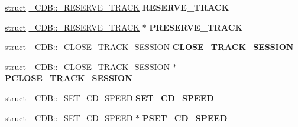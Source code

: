 \begin{DoxyCompactItemize}
\item 
\mbox{\label{union___c_d_b_a91f42014a423f6de89e39864eb13f211}} 
\hyperlink{interfacestruct}{struct} \hyperlink{struct___c_d_b_1_1___r_e_s_e_r_v_e___t_r_a_c_k}{\+\_\+\+C\+D\+B\+::\+\_\+\+R\+E\+S\+E\+R\+V\+E\+\_\+\+T\+R\+A\+CK} {\bfseries R\+E\+S\+E\+R\+V\+E\+\_\+\+T\+R\+A\+CK}
\item 
\mbox{\label{union___c_d_b_a3fa155491005b6d770eb34e5e2172caa}} 
\hyperlink{interfacestruct}{struct} \hyperlink{struct___c_d_b_1_1___r_e_s_e_r_v_e___t_r_a_c_k}{\+\_\+\+C\+D\+B\+::\+\_\+\+R\+E\+S\+E\+R\+V\+E\+\_\+\+T\+R\+A\+CK} $\ast$ {\bfseries P\+R\+E\+S\+E\+R\+V\+E\+\_\+\+T\+R\+A\+CK}
\item 
\mbox{\label{union___c_d_b_ad09170b30a3f38ab1fd83b7c2b35ea4d}} 
\hyperlink{interfacestruct}{struct} \hyperlink{struct___c_d_b_1_1___c_l_o_s_e___t_r_a_c_k___s_e_s_s_i_o_n}{\+\_\+\+C\+D\+B\+::\+\_\+\+C\+L\+O\+S\+E\+\_\+\+T\+R\+A\+C\+K\+\_\+\+S\+E\+S\+S\+I\+ON} {\bfseries C\+L\+O\+S\+E\+\_\+\+T\+R\+A\+C\+K\+\_\+\+S\+E\+S\+S\+I\+ON}
\item 
\mbox{\label{union___c_d_b_a13943a831c266ac196daa356808172bd}} 
\hyperlink{interfacestruct}{struct} \hyperlink{struct___c_d_b_1_1___c_l_o_s_e___t_r_a_c_k___s_e_s_s_i_o_n}{\+\_\+\+C\+D\+B\+::\+\_\+\+C\+L\+O\+S\+E\+\_\+\+T\+R\+A\+C\+K\+\_\+\+S\+E\+S\+S\+I\+ON} $\ast$ {\bfseries P\+C\+L\+O\+S\+E\+\_\+\+T\+R\+A\+C\+K\+\_\+\+S\+E\+S\+S\+I\+ON}
\item 
\mbox{\label{union___c_d_b_ab9194c851f78386caaa67191c487f102}} 
\hyperlink{interfacestruct}{struct} \hyperlink{struct___c_d_b_1_1___s_e_t___c_d___s_p_e_e_d}{\+\_\+\+C\+D\+B\+::\+\_\+\+S\+E\+T\+\_\+\+C\+D\+\_\+\+S\+P\+E\+ED} {\bfseries S\+E\+T\+\_\+\+C\+D\+\_\+\+S\+P\+E\+ED}
\item 
\mbox{\label{union___c_d_b_a9ce17237f8b50862bc20a4543683b3a0}} 
\hyperlink{interfacestruct}{struct} \hyperlink{struct___c_d_b_1_1___s_e_t___c_d___s_p_e_e_d}{\+\_\+\+C\+D\+B\+::\+\_\+\+S\+E\+T\+\_\+\+C\+D\+\_\+\+S\+P\+E\+ED} $\ast$ {\bfseries P\+S\+E\+T\+\_\+\+C\+D\+\_\+\+S\+P\+E\+ED}
\item 
\mbox{\label{union___c_d_b_a0f7f70997d213015e2dbd3453acb71c1}} 

\end{DoxyCompactItemize}
